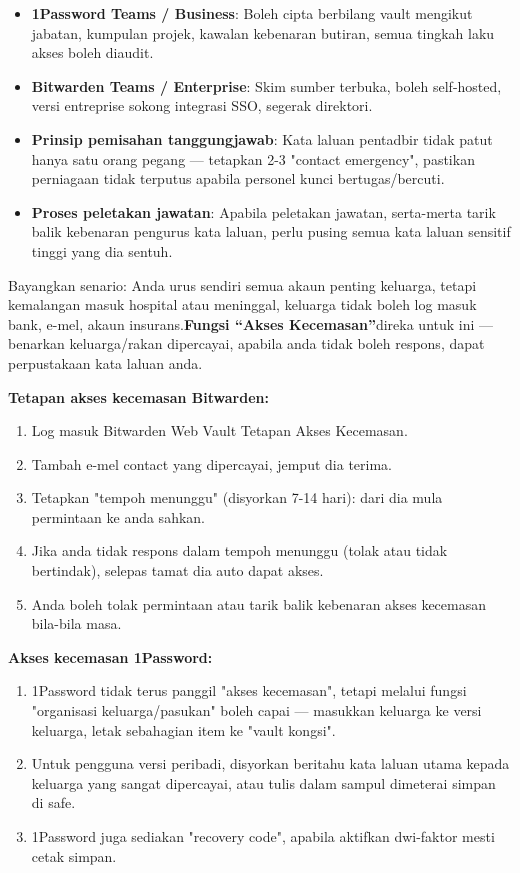 \begin{itemize}
  \item \textbf{1Password Teams / Business}: Boleh cipta berbilang vault mengikut jabatan, kumpulan projek, kawalan kebenaran butiran, semua tingkah laku akses boleh diaudit.
  \item \textbf{Bitwarden Teams / Enterprise}: Skim sumber terbuka, boleh self-hosted, versi entreprise sokong integrasi SSO, segerak direktori.
  \item \textbf{Prinsip pemisahan tanggungjawab}: Kata laluan pentadbir tidak patut hanya satu orang pegang — tetapkan 2-3 "contact emergency", pastikan perniagaan tidak terputus apabila personel kunci bertugas/bercuti.
  \item \textbf{Proses peletakan jawatan}: Apabila peletakan jawatan, serta-merta tarik balik kebenaran pengurus kata laluan, perlu pusing semua kata laluan sensitif tinggi yang dia sentuh.
\end{itemize}


Bayangkan senario: Anda urus sendiri semua akaun penting keluarga, tetapi kemalangan masuk hospital atau meninggal, keluarga tidak boleh log masuk bank, e-mel, akaun insurans.\textbf{Fungsi “Akses Kecemasan”}direka untuk ini — benarkan keluarga/rakan dipercayai, apabila anda tidak boleh respons, dapat perpustakaan kata laluan anda.

\textbf{Tetapan akses kecemasan Bitwarden:}

\begin{enumerate}
  \item Log masuk Bitwarden Web Vault Tetapan Akses Kecemasan.
  \item Tambah e-mel contact yang dipercayai, jemput dia terima.
  \item Tetapkan "tempoh menunggu" (disyorkan 7-14 hari): dari dia mula permintaan ke anda sahkan.
  \item Jika anda tidak respons dalam tempoh menunggu (tolak atau tidak bertindak), selepas tamat dia auto dapat akses.
  \item Anda boleh tolak permintaan atau tarik balik kebenaran akses kecemasan bila-bila masa.
\end{enumerate}

\textbf{Akses kecemasan 1Password:}

\begin{enumerate}
  \item 1Password tidak terus panggil "akses kecemasan", tetapi melalui fungsi "organisasi keluarga/pasukan" boleh capai — masukkan keluarga ke versi keluarga, letak sebahagian item ke "vault kongsi".
  \item Untuk pengguna versi peribadi, disyorkan beritahu kata laluan utama kepada keluarga yang sangat dipercayai, atau tulis dalam sampul dimeterai simpan di safe.
  \item 1Password juga sediakan "recovery code", apabila aktifkan dwi-faktor mesti cetak simpan.
\end{enumerate}

